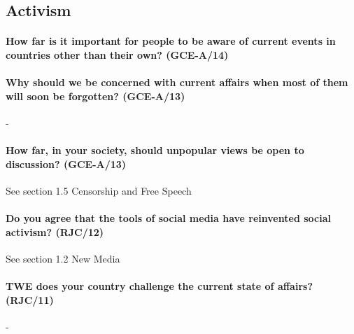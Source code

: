 \documentclass[../../main]{subfiles}
\begin{document}
\subsection{Activism}

\paragraph{How far is it important for people to be aware of current events in countries other than their own? (GCE-A/14)}

\paragraph{Why should we be concerned with current affairs when most of them will soon be forgotten? (GCE-A/13)}-

\paragraph{How far, in your society, should unpopular views be open to discussion? (GCE-A/13)} See section 1.5 Censorship and Free Speech

\paragraph{Do you agree that the tools of social media have reinvented social activism? (RJC/12)} See section 1.2 New Media

\paragraph{TWE does your country challenge the current state of affairs? (RJC/11)}-
\end{document}
